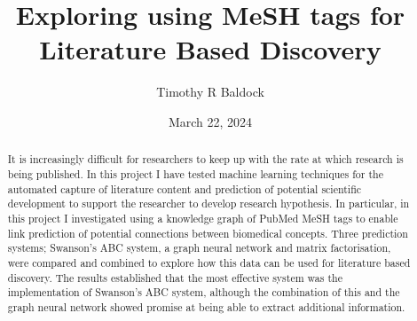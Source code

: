 \documentclass{l4proj}
\begin{document}
\title{Exploring using MeSH tags for Literature Based Discovery}
\author{Timothy R Baldock}
\date{March 22, 2024}

\maketitle

\begin{abstract}
    
    It is increasingly difficult for researchers to keep up with the rate at which research is being published. In this project I have tested  machine learning techniques for the automated capture of literature content and prediction of potential scientific development to support the researcher to develop research hypothesis. In particular, in this project I investigated using a knowledge graph of PubMed MeSH tags to enable link prediction of potential connections between biomedical concepts. Three prediction systems; Swanson's ABC system, a graph neural network and matrix factorisation, were compared and combined to explore how this data can be used for literature based discovery. The results established that the most effective  system was the implementation of Swanson's ABC system, although the combination of this and the graph neural network showed promise at being able to extract additional information. 

\end{abstract}



%
%
\def\consentname {Timothy R Baldock} %
\def\consentdate {22 March 2024} %
%
\educationalconsent


\tableofcontents
\end{document}
